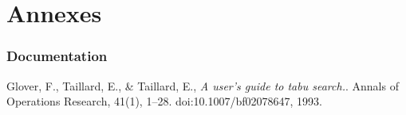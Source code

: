 \part*{Annexes}

\stopcontents

\startcontents[sections]

\setcounter{section}{0}

\newpage

\section{Documentation}


\begin{thebibliography}{999}

  Glover, F., Taillard, E., \& Taillard, E.,
  \emph{A user’s guide to tabu search.}.
  Annals of Operations Research, 41(1), 1–28. doi:10.1007/bf02078647,
  1993.

\end{thebibliography}

\noindent
  \begin{minipage}[c]{\textwidth}
    \centering
  \end{minipage}

